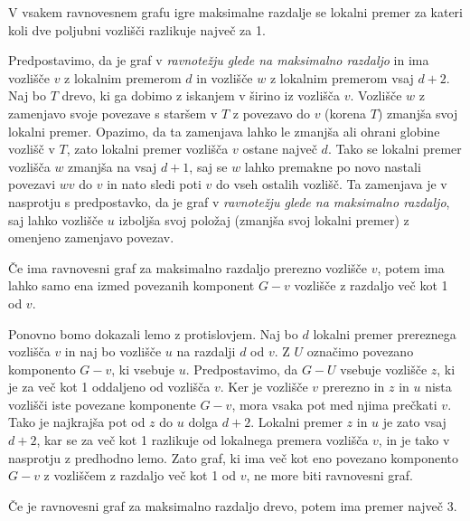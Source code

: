 \documentclass[fin1, tisk]{fmfdelo}
\begin{document}
\begin{lema}
V vsakem ravnovesnem grafu igre maksimalne razdalje se lokalni premer za kateri koli dve poljubni vozlišči razlikuje največ za 1.
\end{lema}

\begin{dokaz}
Predpostavimo, da je graf v \textit{ravnotežju glede na maksimalno razdaljo} in ima vozlišče \(v\) z lokalnim premerom \(d\) in vozlišče \(w\) z lokalnim premerom vsaj \(d+2\). Naj bo \(T\) drevo, ki ga dobimo z iskanjem v širino iz vozlišča \(v\). Vozlišče \(w\) z zamenjavo svoje povezave s staršem v \(T\) z povezavo do \(v\) (korena \(T\)) zmanjša svoj lokalni premer. Opazimo, da ta zamenjava lahko le zmanjša ali ohrani globine vozlišč v \(T\), zato lokalni premer vozlišča \(v\) ostane največ \(d\). Tako se lokalni premer vozlišča \(w\) zmanjša na vsaj \(d+1\), saj se \(w\) lahko premakne po novo nastali povezavi \(wv\) do \(v\) in nato sledi poti \(v\) do vseh ostalih vozlišč. Ta zamenjava je v nasprotju s predpostavko, da je graf v \textit{ravnotežju glede na maksimalno razdaljo}, saj lahko vozlišče \(u\) izboljša svoj položaj (zmanjša svoj lokalni premer) z omenjeno zamenjavo povezav.
\end{dokaz}

\begin{lema}
Če ima ravnovesni graf za maksimalno razdaljo prerezno vozlišče \(v\), potem ima lahko samo ena izmed povezanih komponent \(G - v\) vozlišče z razdaljo več kot 1 od \(v\).
\end{lema}

\begin{dokaz}
Ponovno bomo dokazali lemo z protislovjem. Naj bo \(d\) lokalni premer prereznega vozlišča \(v\) in naj bo vozlišče \(u\) na razdalji \(d\) od \(v\). Z \(U\) označimo povezano komponento \(G - v\), ki vsebuje \(u\). Predpostavimo, da \(G - U\) vsebuje vozlišče \(z\), ki je za več kot 1 oddaljeno od vozlišča \(v\). Ker je vozlišče \(v\) prerezno in \(z\) in \(u\) nista vozlišči iste povezane komponente \(G - v\), mora vsaka pot med njima prečkati \(v\). Tako je najkrajša pot od \(z\) do \(u\) dolga \(d + 2\). Lokalni premer \(z\) in \(u\) je zato vsaj \(d + 2\), kar se za več kot 1 razlikuje od lokalnega premera vozlišča \(v\), in je tako v nasprotju z predhodno lemo. Zato graf, ki ima več kot eno povezano komponento \(G - v\) z vozliščem z razdaljo več kot 1 od \(v\), ne more biti ravnovesni graf.
\end{dokaz}

\begin{izrek}
Če je ravnovesni graf za maksimalno razdaljo drevo, potem ima premer največ 3.
\end{izrek}
\end{document}
